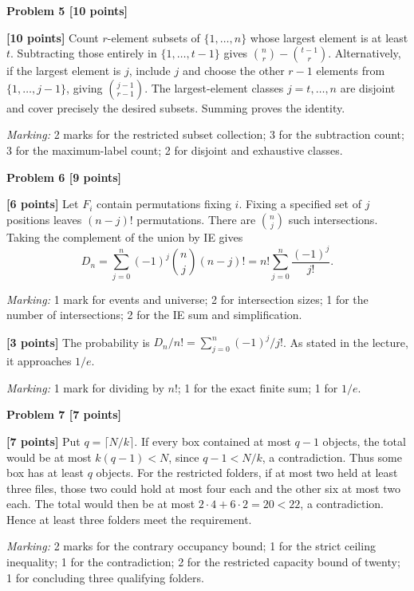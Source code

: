 \documentclass[12pt,letterpaper]{article}
\newcommand{\problemheading}[2][5\baselineskip]{\Needspace{#1}\par\noindent\hspace*{-0.625in}\textbf{#2}\par\nobreak\vspace{0.3em}}
\begin{document}
\vspace{0.65em}
\problemheading[\dimexpr 3\baselineskip+4\baselineskip\relax]{Problem 5 [10 points]}
\begin{description}[font=\normalfont,leftmargin=1.2em,labelsep=0.4em]
\item[] \textbf{[10 points]} Count $r$-element subsets of $\{1,\ldots,n\}$ whose largest element is at least $t$. Subtracting those entirely in $\{1,\ldots,t-1\}$ gives $\binom nr-\binom{t-1}{r}$. Alternatively, if the largest element is $j$, include $j$ and choose the other $r-1$ elements from $\{1,\ldots,j-1\}$, giving $\binom{j-1}{r-1}$. The largest-element classes $j=t,\ldots,n$ are disjoint and cover precisely the desired subsets. Summing proves the identity.
\par\textit{Marking:} 2 marks for the restricted subset collection; 3 for the subtraction count; 3 for the maximum-label count; 2 for disjoint and exhaustive classes.
\end{description}
\vspace{0.65em}
\problemheading[\dimexpr 3\baselineskip+4\baselineskip\relax]{Problem 6 [9 points]}
\begin{description}[font=\normalfont,leftmargin=1.2em,labelsep=0.4em]
\item[(a)] \textbf{[6 points]} Let $F_i$ contain permutations fixing $i$. Fixing a specified set of $j$ positions leaves $(n-j)!$ permutations. There are $\binom nj$ such intersections. Taking the complement of the union by IE gives\[D_n=\sum_{j=0}^n(-1)^j\binom nj(n-j)!=n!\sum_{j=0}^n\frac{(-1)^j}{j!}.\]
\par\textit{Marking:} 1 mark for events and universe; 2 for intersection sizes; 1 for the number of intersections; 2 for the IE sum and simplification.
\item[(b)] \textbf{[3 points]} The probability is $D_n/n!=\sum_{j=0}^n(-1)^j/j!$. As stated in the lecture, it approaches $1/e$.
\par\textit{Marking:} 1 mark for dividing by $n!$; 1 for the exact finite sum; 1 for $1/e$.
\end{description}
\vspace{0.65em}
\problemheading[\dimexpr 3\baselineskip+4\baselineskip\relax]{Problem 7 [7 points]}
\begin{description}[font=\normalfont,leftmargin=1.2em,labelsep=0.4em]
\item[] \textbf{[7 points]} Put $q=\lceil N/k\rceil$. If every box contained at most $q-1$ objects, the total would be at most $k(q-1)<N$, since $q-1<N/k$, a contradiction. Thus some box has at least $q$ objects. For the restricted folders, if at most two held at least three files, those two could hold at most four each and the other six at most two each. The total would then be at most $2\cdot4+6\cdot2=20<22$, a contradiction. Hence at least three folders meet the requirement.
\par\textit{Marking:} 2 marks for the contrary occupancy bound; 1 for the strict ceiling inequality; 1 for the contradiction; 2 for the restricted capacity bound of twenty; 1 for concluding three qualifying folders.
\end{description}
\end{document}

